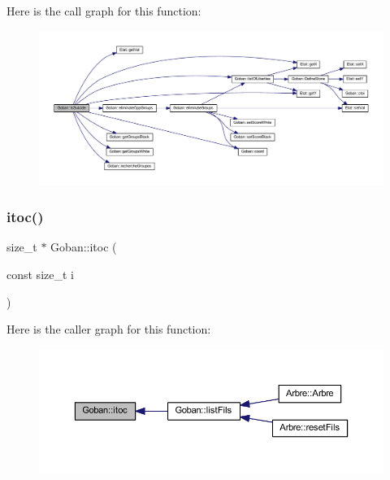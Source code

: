 Here is the call graph for this function\+:
\nopagebreak
\begin{figure}[H]
\begin{center}
\leavevmode
\includegraphics[width=350pt]{class_goban_a8b95ea2b51c078381562e361ff7febac_cgraph}
\end{center}
\end{figure}
\mbox{\label{class_goban_aa2aaa3b4db4549d169bd0ff234d601cb}} 
\subsubsection{\texorpdfstring{itoc()}{itoc()}}
{\footnotesize\ttfamily size\+\_\+t $\ast$ Goban\+::itoc (\begin{DoxyParamCaption}\item[{const size\+\_\+t}]{i }\end{DoxyParamCaption})}

Here is the caller graph for this function\+:
\nopagebreak
\begin{figure}[H]
\begin{center}
\leavevmode
\includegraphics[width=350pt]{class_goban_aa2aaa3b4db4549d169bd0ff234d601cb_icgraph}
\end{center}
\end{figure}
\mbox{\label{class_goban_a799390f04139eec16f7bb8c79b381303}} 
